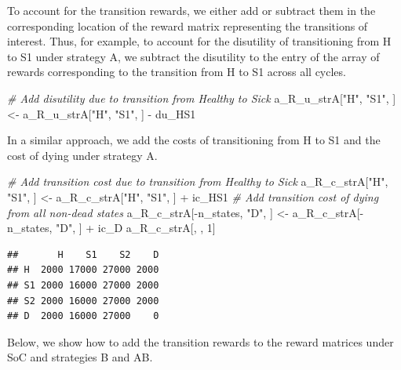 \documentclass[
]{article}
\newenvironment{Shaded}{\begin{snugshade}}{\end{snugshade}}
\newcommand{\CommentTok}[1]{\textcolor[rgb]{0.56,0.35,0.01}{\textit{#1}}}
\newcommand{\DecValTok}[1]{\textcolor[rgb]{0.00,0.00,0.81}{#1}}
\newcommand{\NormalTok}[1]{#1}
\newcommand{\OtherTok}[1]{\textcolor[rgb]{0.56,0.35,0.01}{#1}}
\newcommand{\SpecialCharTok}[1]{\textcolor[rgb]{0.00,0.00,0.00}{#1}}
\newcommand{\StringTok}[1]{\textcolor[rgb]{0.31,0.60,0.02}{#1}}
\begin{document}
To account for the transition rewards, we either add or subtract them in the corresponding location of the reward matrix representing the transitions of interest. Thus, for example, to account for the disutility of transitioning from H to S1 under strategy A, we subtract the disutility to the entry of the array of rewards corresponding to the transition from H to S1 across all cycles.

\begin{Shaded}
\begin{Highlighting}[]
\CommentTok{\# Add disutility due to transition from Healthy to Sick}
\NormalTok{a\_R\_u\_strA[}\StringTok{"H"}\NormalTok{, }\StringTok{"S1"}\NormalTok{, ] }\OtherTok{\textless{}{-}}\NormalTok{ a\_R\_u\_strA[}\StringTok{"H"}\NormalTok{, }\StringTok{"S1"}\NormalTok{, ] }\SpecialCharTok{{-}}\NormalTok{ du\_HS1}
\end{Highlighting}
\end{Shaded}

In a similar approach, we add the costs of transitioning from H to S1 and the cost of dying under strategy A.

\begin{Shaded}
\begin{Highlighting}[]
\CommentTok{\# Add transition cost due to transition from Healthy to Sick}
\NormalTok{a\_R\_c\_strA[}\StringTok{"H"}\NormalTok{, }\StringTok{"S1"}\NormalTok{, ] }\OtherTok{\textless{}{-}}\NormalTok{ a\_R\_c\_strA[}\StringTok{"H"}\NormalTok{, }\StringTok{"S1"}\NormalTok{, ] }\SpecialCharTok{+}\NormalTok{ ic\_HS1}
\CommentTok{\# Add transition cost of dying from all non{-}dead states}
\NormalTok{a\_R\_c\_strA[}\SpecialCharTok{{-}}\NormalTok{n\_states, }\StringTok{"D"}\NormalTok{, ] }\OtherTok{\textless{}{-}}\NormalTok{ a\_R\_c\_strA[}\SpecialCharTok{{-}}\NormalTok{n\_states, }\StringTok{"D"}\NormalTok{, ] }\SpecialCharTok{+}\NormalTok{ ic\_D}
\NormalTok{a\_R\_c\_strA[, , }\DecValTok{1}\NormalTok{]}
\end{Highlighting}
\end{Shaded}

\begin{verbatim}
##       H    S1    S2    D
## H  2000 17000 27000 2000
## S1 2000 16000 27000 2000
## S2 2000 16000 27000 2000
## D  2000 16000 27000    0
\end{verbatim}

Below, we show how to add the transition rewards to the reward matrices under SoC and strategies B and AB.
\end{document}
